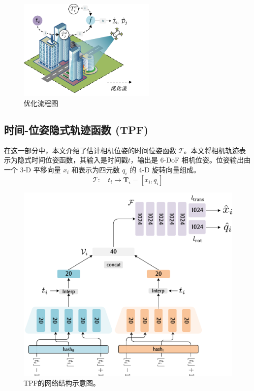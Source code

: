 \begin{figure}[ht]
    \centering
    \includegraphics[width=0.6\textwidth]{undergraduate-thesis/images/time-pose function/Problem Formulation export.pdf}
    \caption{优化流程图}
    \label{fig:time-pose function optimization flow}
\end{figure}

\subsection{时间-位姿隐式轨迹函数 (TPF)}
在这一部分中，本文介绍了估计相机位姿的时间位姿函数 $\mathcal{T}$。本文将相机轨迹表示为隐式时间位姿函数，其输入是时间戳$t$，输出是 6-DoF 相机位姿。位姿输出由一个 3-D 平移向量 $x_i$ 和表示为四元数\cite{sola_micro_2021} $q_i$ 的 4-D 旋转向量组成。
\begin{equation}
    \mathcal{T}:\quad t_i\to\mathbf{T}_i=[x_i, q_i]
\end{equation}

\begin{figure}[ht]
    \centering
    \includegraphics[width=\textwidth]{undergraduate-thesis/images/time-pose function/Hash.pdf}
    \caption{TPF的网络结构示意图。}
    \label{fig:time-pose function structure}
\end{figure}

